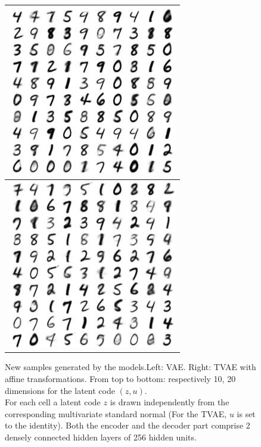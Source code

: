 \documentclass[letterpaper, twoside]{article}
\begin{document}
\begin{figure}[H]
\begin{minipage}{.33\textwidth}
\begin{flushleft}
\begin{tabular}{|@{}c@{}|}
\end{tabular}
\end{flushleft}
\end{minipage}%
\begin{minipage}{.33\textwidth}
\begin{tabular}{|@{}c@{}|}\hline
\includegraphics[scale=1]{manifold_126.jpg}\\ \hline
\includegraphics[scale=1]{manifold_127.jpg}\\ \hline
\end{tabular}
\end{minipage}

\caption{New samples generated by the models.Left: VAE. Right: TVAE with affine transformations. From top to bottom: respectively 10, 20 dimensions for the latent code $(z, u)$.\\ For each cell a latent code $z$ is drawn independently from the corresponding multivariate standard normal (For the TVAE, $u$ is set to the identity). Both the encoder and the decoder part comprise 2 densely connected hidden layers of 256 hidden units.}
\label{generatedcomparison}
\end{figure}
\end{document}

